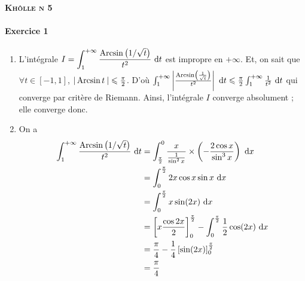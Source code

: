 \documentclass[a4paper]{article}
\begin{document}
	\begin{center}
		\bfseries\scshape\Huge Khôlle n 5
	\end{center}

	\paragraph{Exercice 1}
	\begin{enumerate}
		\item L'intégrale $\displaystyle I = \int_{1}^{+\infty}  \frac{\operatorname{Arcsin}\big(1 / \sqrt{t}\big)}{t^2}~\mathrm{d}t$\/ est impropre en $+\infty$. Et, on sait que $\forall t \in [-1,1]$, $|\operatorname{Arcsin} t\:| \leqslant \frac{\pi}{2}$. D'où $\int_{1}^{+\infty} \left| \frac{\operatorname{Arcsin}\left( \frac{1}{\sqrt{t}} \right)}{t^2} \right|~\mathrm{d}t \leqslant \frac{\pi}{2} \int_{1}^{+\infty} \frac{1}{t^2}~\mathrm{d}t$\/ qui converge par critère de {\sc Riemann}.
			Ainsi, l'intégrale $I$\/ converge absolument ; elle converge donc.
		\item On a
			\begin{align*}
				\int_{1}^{+\infty} \frac{\operatorname{Arcsin}\left( 1/\sqrt{t} \right)}{t^2}~\mathrm{d}t
				&= \int_{\frac{\pi}{2}}^{0} \frac{x}{\frac{1}{\sin^2 x}} \times \left( -\frac{2\cos x}{\sin^3 x} \right)~\mathrm{d}x \\
				&= \int_{0}^{\frac{\pi}{2}} 2x \cos x \sin x~\mathrm{d}x \\
				&= \int_{0}^{\frac{\pi}{2}} x\sin(2x)~\mathrm{d}x \\
				&= \left[ x\frac{\cos 2x}{2} \right]_0^{\frac{\pi}{2}}  - \int_{0}^{\frac{\pi}{2}} \frac{1}{2}\cos(2x)~\mathrm{d}x \\
				&= \frac{\pi}{4} - \frac{1}{4} \left[ \sin(2x) \right]_0^{\frac{\pi}{2}} \\
				&= \frac{\pi}{4} \\
			\end{align*}
	\end{enumerate}
\end{document}
